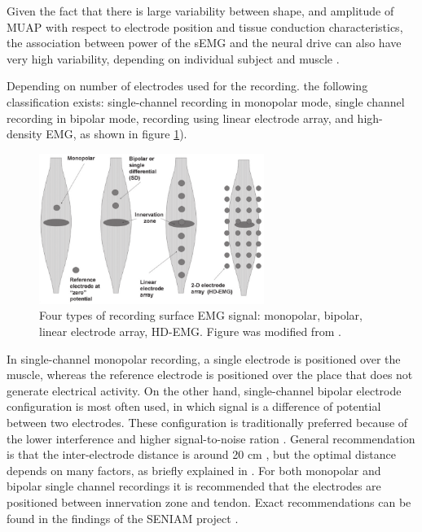 Given the fact that there is large variability between shape, and amplitude of MUAP with respect to electrode position and tissue conduction characteristics, the association between power of the sEMG and the neural drive can also have very high variability, depending on individual subject and muscle \citep{Farina2014}. 

Depending on number of electrodes used for the recording. the following classification exists: single-channel recording in monopolar mode, single channel recording in bipolar mode, recording using linear electrode array, and high-density EMG, as shown in figure \ref{fig:electrode_types}).
\begin{figure}[ht]
\centering
\includegraphics[width=0.65\textwidth]{Images/introduction/electrode_types.png}
\caption{Four types of recording surface EMG signal: monopolar, bipolar, linear electrode array, HD-EMG. Figure was modified from \citep{Merletti2010}.}
\label{fig:electrode_types}
\end{figure}

In single-channel monopolar recording, a single electrode is positioned over the muscle, whereas the reference electrode is positioned over the place that does not generate electrical activity. On the other hand, single-channel bipolar electrode configuration is most often used, in which signal is a difference of potential between two electrodes. These configuration is traditionally preferred because of the lower interference and higher signal-to-noise ration \citep{Merletti-book}. General recommendation is that the inter-electrode distance is around 20 cm \citep{Hermens1999}, but the optimal distance depends on many factors, as briefly explained in \citep{Hakonen2015}. For both monopolar and bipolar single channel recordings it is recommended that the electrodes are positioned between innervation zone and tendon. Exact recommendations can be found in the findings of the SENIAM project \citet{Hermens1999}.

